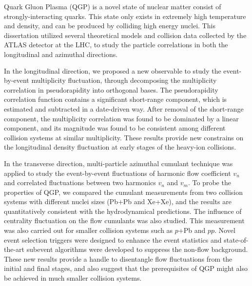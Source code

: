 \documentclass[12pt]{article}
\begin{document}
Quark Gluon Plasma (QGP) is a novel state of nuclear matter consist of strongly-interacting quarks. This state only exists in extremely high temperature and density, and can be produced by colliding high energy nuclei. This dissertation utilized several theoretical models and collision data collected by the ATLAS detector at the LHC, to study the particle correlations in both the longitudinal and azimuthal directions.

In the longitudinal direction, we proposed a new observable to study the event-by-event multiplicity fluctuation, through decomposing the multiplicity correlation in pseudorapidity into orthogonal bases. The pseudorapidity correlation function contains a significant short-range component, which is estimated and subtracted in a date-driven way. After removal of the short-range component, the multiplicity correlation was found to be dominated by a linear component, and its magnitude was found to be consistent among different collision systems at similar multiplicity. These results provide new constrains on the longitudinal density fluctuation at early stages of the heavy-ion collisions.

In the transverse direction, multi-particle azimuthal cumulant technique was applied to study the event-by-event fluctuations of harmonic flow coefficient $v_n$ and correlated fluctuations between two harmonics $v_n$ and $v_m$. To probe the properties of QGP, we compared the cumulant measurements from two collision systems with different nuclei sizes (Pb+Pb and Xe+Xe), and the results are quantitatively consistent with the hydrodynamical predictions. The influence of centrality fluctuation on the flow cumulants was also studied. This measurement was also carried out for smaller collision systems such as $p$+Pb and $pp$. Novel event selection triggers were designed to enhance the event statistics and state-of-the-art subevent algorithms were developed to suppress the non-flow background. These new results provide a handle to disentangle flow fluctuations from the initial and final stages, and also suggest that the prerequisites of QGP might also be achieved in much smaller collision systems.



\end{document}
